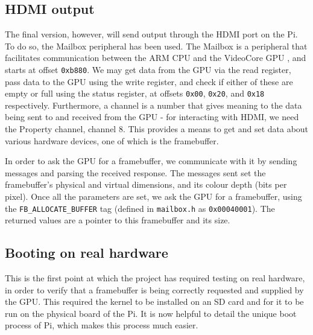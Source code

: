 \documentclass[10pt,a4paper]{article}
\newcommand{\code}[1]{\texttt{#1}}
\begin{document}
\subsection*{HDMI output}
The final version, however, will send output through the HDMI port on the Pi. To
do so, the Mailbox peripheral has been used. The Mailbox is a peripheral that
facilitates communication between the ARM CPU and the VideoCore GPU
\cite{Mailboxes}, and starts at offset \code{0xb880}. We may get data from the
GPU via the read register, pass data to the GPU using the write register, and
check if either of these are empty or full using the status register, at offsets
\code{0x00}, \code{0x20}, and \code{0x18} respectively. Furthermore, a channel
is a number that gives meaning to the data being sent to and received from the
GPU - for interacting with HDMI, we need the Property channel, channel 8. This
provides a means to get and set data about various hardware devices, one of
which is the framebuffer.

In order to ask the GPU for a framebuffer, we communicate with it by sending
messages and parsing the received response. The messages sent set the
framebuffer's physical and virtual dimensions, and its colour depth (bits per
pixel). Once all the parameters are set, we ask the GPU for a framebuffer, using
the \code{FB\_ALLOCATE\_BUFFER} tag (defined in \code{mailbox.h} as
\code{0x00040001}). The returned values are a pointer to this framebuffer and
its size. 

\subsection*{Booting on real hardware}
This is the first point at which the project has required testing on real
hardware, in order to verify that a framebuffer is being correctly requested and
supplied by the GPU. This required the kernel to be installed on an SD card and
for it to be run on the physical board of the Pi. It is now helpful to detail
the unique boot process of Pi, which makes this process much easier.
\end{document}
